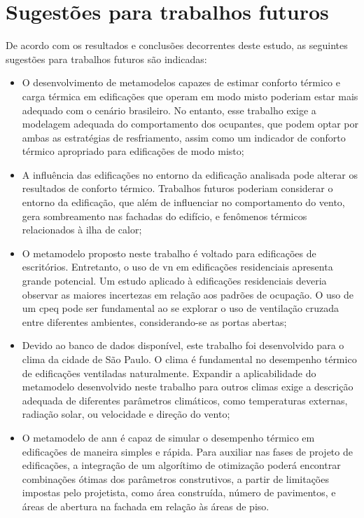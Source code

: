 \documentclass[brazil,hardcopy,openany]{ufscthesis} %
\begin{document}
\section{Sugestões para trabalhos futuros}

De acordo com os resultados e conclusões decorrentes deste estudo, as seguintes sugestões para trabalhos futuros são indicadas:

\begin{itemize}
	\item O desenvolvimento de metamodelos capazes de estimar conforto térmico e carga térmica em edificações que operam em modo misto poderiam estar mais adequado com o cenário brasileiro. No entanto, esse trabalho exige a modelagem adequada do comportamento dos ocupantes, que podem optar por ambas as estratégias de resfriamento, assim como um indicador de conforto térmico apropriado para edificações de modo misto;

	\item A influência das edificações no entorno da edificação analisada pode alterar os resultados de conforto térmico. Trabalhos futuros poderiam considerar o entorno da edificação, que além de influenciar no comportamento do vento, gera sombreamento nas fachadas do edifício, e fenômenos térmicos relacionados à ilha de calor;
	
	\item O metamodelo proposto neste trabalho é voltado para edificações de escritórios. Entretanto, o uso de \acrlong{vn} em edificações residenciais apresenta grande potencial. Um estudo aplicado à edificações residenciais deveria observar as maiores incertezas em relação aos padrões de ocupação. O uso de um \acrfull{cpeq} pode ser fundamental ao se explorar o uso de ventilação cruzada entre diferentes ambientes, considerando-se as portas abertas;

	\item Devido ao banco de dados disponível, este trabalho foi desenvolvido para o clima da cidade de São Paulo. O clima é fundamental no desempenho térmico de edificações ventiladas naturalmente. Expandir a aplicabilidade do metamodelo desenvolvido neste trabalho para outros climas exige a descrição adequada de diferentes parâmetros climáticos, como temperaturas externas, radiação solar, ou velocidade e direção do vento;
	

	\item O metamodelo de \acrshort{ann} é capaz de simular o desempenho térmico em edificações de maneira simples e rápida. Para auxiliar nas fases de projeto de edificações, a integração de um algorítimo de otimização poderá encontrar combinações ótimas dos parâmetros construtivos, a partir de limitações impostas pelo projetista, como área construída, número de pavimentos, e áreas de abertura na fachada em relação às áreas de piso.
	
\end{itemize}
\end{document}
